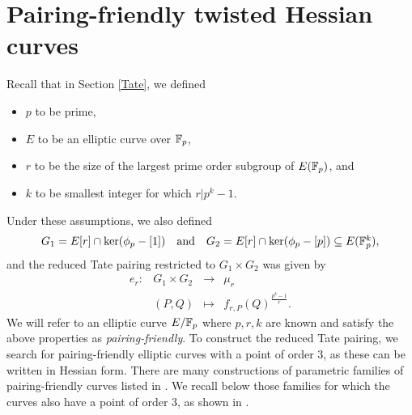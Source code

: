 \section{Pairing-friendly twisted Hessian curves}
\label{sec:curves}

Recall that in Section \ref{Tate}, we defined
\begin{itemize}
\item $p$ to be prime,
\item $E$ to be an elliptic curve over $\mathbb{F}_{p}$,
\item $r$ to be the size of the largest prime order subgroup of $E(\mathbb{F}_{p})$, and
\item $k$ to be smallest integer for which $r | p^{k}-1$.
\end{itemize}
Under these assumptions, we also defined 
\[\begin{array}{ccc}
G_{1} = E[r] \cap \ker(\phi_{p} - [1]) & \text{and} & G_{2} = E[r] \cap \ker(\phi_{p} - [p]) \subseteq E(\mathbb{F}_{p}^{k}),
\end{array}\]
and the reduced Tate pairing restricted to $G_{1} \times G_{2}$ was given by
\[\begin{array}{rccc}
e_{r}:& G_{1} \times G_{2} & \longrightarrow & \mu_{r} \\
& (P,Q) & \mapsto & f_{r,P}(Q)^{\frac{p^{k}-1}{r}}.
\end{array}\]
We will refer to an elliptic curve $E/\mathbb{F}_{p}$ where $p,r,k$ are known and satisfy the above properties as \emph{pairing-friendly}. To construct the reduced Tate pairing, we search for pairing-friendly elliptic curves with a point of order 3, as these can be written in Hessian form. There are many constructions of parametric families of pairing-friendly curves listed in \cite{2010/freeman}. We recall below those families for which the curves also have a point of order 3, as shown in \cite[Section 5]{2015/hessian}.




